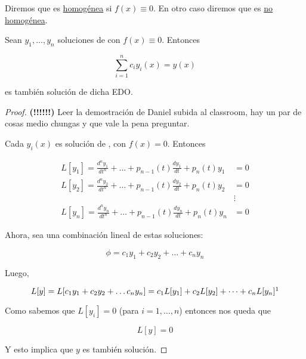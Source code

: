 \begin{defn}
    Diremos que  es \ul{homogénea} si $f(x) \equiv 0$. En otro caso diremos que es \ul{no homogénea}.
\end{defn}

\begin{pro}
    Sean $y_1, \dots, y_n$ soluciones de  con $f(x) \equiv 0$. Entonces

    \begin{equation}\label{eq:combinacionl}
        \sum_{i=1}^{n} c_i y_i(x) = y(x)
    \end{equation}

    \noindent es también solución de dicha EDO.
\end{pro}

\begin{proof}
    \textbf{(!!!!!!)} Leer la demostración de Daniel subida al classroom, hay un par de cosas medio chungas y que vale la pena preguntar.

    Cada $y_i(x)$ es solución de , con $f(x) = 0$. Entonces

    \begin{equation*}
        \begin{aligned}
            L[y_1] = \frac{d^ny_1}{dt^n} + \dots + p_{n-1}(t)\frac{dy_1}{dt} + p_n(t)y_1 &= 0 \\
            L[y_2] = \frac{d^ny_2}{dt^n} + \dots + p_{n-1}(t)\frac{dy_2}{dt} + p_n(t)y_2 &= 0 \\
            &\vdots \\
            L[y_n] = \frac{d^ny_n}{dt^n} + \dots + p_{n-1}(t)\frac{dy_n}{dt} + p_n(t)y_n &= 0
        \end{aligned}
    \end{equation*}

    Ahora, sea una combinación lineal de estas soluciones:

    \[
        \phi = c_1y_1 + c_2y_2 + \dots + c_ny_n
    \]

    Luego,

    \[
        L[y] = L[c_1y_1 + c_2y_2 + \dots c_ny_n] = c_1L[y_1] + c_2L[y_2] + \dots + c_nL[y_n]\footnotemark
    \]

    Como sabemos que $L[y_i] = 0$ (para $i=1,\dots,n$) entonces nos queda que

    \[
        L[y] = 0
    \]

    Y esto implica que $y$ es también solución.
\end{proof}

